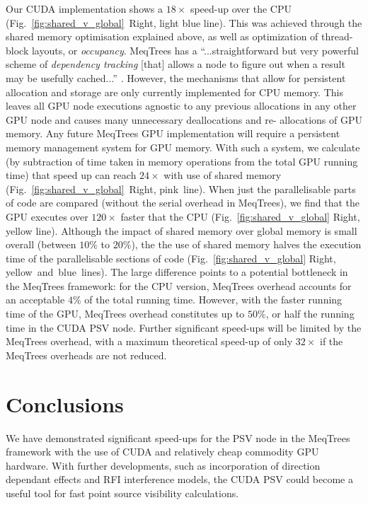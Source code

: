 Our CUDA implementation shows a $18\times$ speed-up over the CPU
(Fig.~\ref{fig:shared_v_global}~Right, light blue line). This was achieved
through the shared memory optimisation explained above, as well as optimization
of  thread-block layouts, or \emph{occupancy}.     
MeqTrees has a ``...straightforward but very powerful scheme of
\emph{dependency tracking} [that] allows a node to figure out when a result
may be usefully cached...'' \citep{Noordam2011}. However,  the mechanisms that
allow for persistent allocation and storage are only currently implemented for
CPU memory.
This leaves all GPU node executions agnostic to any previous allocations in
any other GPU node and causes many unnecessary deallocations and re-
allocations of GPU memory. Any future MeqTrees GPU implementation will require
a persistent memory management system for GPU memory. With such a system, we
calculate (by subtraction of time taken in memory operations from the total
GPU running time) that speed up can reach $24\times$ with use of shared memory
(Fig.~\ref{fig:shared_v_global}~Right, pink~line). When just the
parallelisable parts of code are compared (without the serial overhead in
MeqTrees), we find that the GPU executes over $120\times$ faster that the CPU
(Fig.~\ref{fig:shared_v_global} Right, yellow line). Although the impact of
shared memory over global memory is small overall (between $10\%$ to $20\%$),
the the use of shared memory halves the execution time of the parallelisable
sections of code (Fig.~\ref{fig:shared_v_global} Right,
yellow~and~blue~lines). The large difference points to a potential bottleneck
in the MeqTrees framework: for the CPU version, MeqTrees overhead accounts for
an acceptable $4\%$ of the total running time. However, with the faster
running time of the GPU, MeqTrees overhead constitutes up to $50\%$, or half
the running time in the CUDA PSV node. Further significant speed-ups will be
limited by the MeqTrees overhead, with a maximum theoretical speed-up of only
$32\times$ if the MeqTrees overheads are not reduced.

\section{Conclusions}

We have demonstrated significant speed-ups for the PSV node in the MeqTrees
framework with the use of  CUDA and relatively cheap commodity GPU hardware.
With further developments, such as  incorporation of direction dependant
effects and RFI interference models, the CUDA PSV could become a useful tool
for fast point source visibility calculations.



